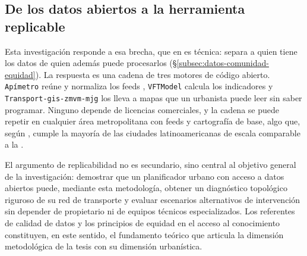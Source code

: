 \subsection{De los datos abiertos a la herramienta replicable}
\label{subsec:datos-herramienta-replicable}

Esta investigación responde a esa brecha, que en \citet{gurstein2011open} es
técnica: separa a quien tiene los datos de quien además puede procesarlos
(§\ref{subsec:datos-comunidad-equidad}). La respuesta es una cadena de tres
motores de código abierto. \texttt{Apímetro} reúne y normaliza los feeds
\gtfs{}, \texttt{VFTModel} calcula los indicadores y
\texttt{Transport-gis-zmvm-mjg} los lleva a mapas que un urbanista puede leer sin
saber programar. Ninguno depende de licencias comerciales, y la cadena se puede
repetir en cualquier área metropolitana con feeds \gtfs{} y cartografía \gis{}
de base, algo que, según \citet{barrington2017world}, cumple la mayoría de las
ciudades latinoamericanas de escala comparable a la \zmvm{}.

El argumento de replicabilidad no es secundario, sino central al objetivo
general de la investigación: demostrar que un planificador urbano con acceso a
datos abiertos puede, mediante esta metodología, obtener un diagnóstico
topológico riguroso de su red de transporte y evaluar escenarios alternativos de
intervención sin depender de  propietario ni de equipos técnicos
especializados. Los referentes de calidad de datos
\citep{haklay2010good, barrington2017world} y los principios de equidad en el
acceso al conocimiento \citep{gurstein2011open, neis2012street} constituyen, en
este sentido, el fundamento teórico que articula la dimensión metodológica de la
tesis con su dimensión urbanística.


